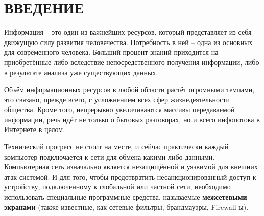 \section*{ВВЕДЕНИЕ}

Информация -- это один из важнейших ресурсов, который представляет из себя движущую силу развития человечества. Потребность в ней -- одна из основных для современного человека. Б\textbf{о}льший процент знаний приходится на приобретённые либо вследствие непосредственного получения информации, либо в результате анализа уже существующих данных. 

Объём информационных ресурсов в любой области растёт огромными темпами, это связано, прежде всего, с усложнением всех сфер жизнедеятельности общества. Кроме того, непрерывно увеличиваются массивы передаваемой информации, речь идёт не только о бытовых разговорах, но и всего инфопотока в Интернете в целом. 

Технический прогресс не стоит на месте, и сейчас практически каждый компьютер подключается к сети для обмена какими-либо данными. Компьютерная сеть изначально является незащищённой и уязвимой для внешних атак системой. И для того, чтобы предотвратить несанкционированный доступ к устройству, подключенному к глобальной или частной сети, необходимо использовать специальные программные средства, называемые \textbf{межсетевыми экранами} (также известные, как сетевые фильтры, брандмауэры, Firewall-ы).
